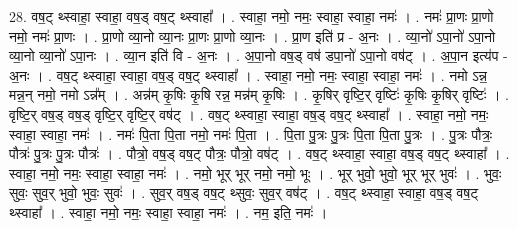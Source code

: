 \documentclass[17pt]{extarticle}
\begin{document}
28. वष॒ट् थ्स्वाहा॒ स्वाहा॒ वष॒ड् वष॒ट् थ्स्वाहा᳚ । . स्वाहा॒ नमो॒ नमः॒ स्वाहा॒ स्वाहा॒ नमः॑ । . नमः॑ प्रा॒णः प्रा॒णो नमो॒ नमः॑ प्रा॒णः । . प्रा॒णो व्या॒नो व्या॒नः प्रा॒णः प्रा॒णो व्या॒नः । . प्रा॒ण इति॑ प्र - अ॒नः । . व्या॒नो॑ ऽपा॒नो॑ ऽपा॒नो व्या॒नो व्या॒नो॑ ऽपा॒नः । . व्या॒न इति॑ वि - अ॒नः । . अ॒पा॒नो वष॒ड् वष॑ डपा॒नो॑ ऽपा॒नो वष॑ट् । . अ॒पा॒न इत्य॑प - अ॒नः । . वष॒ट् थ्स्वाहा॒ स्वाहा॒ वष॒ड् वष॒ट् थ्स्वाहा᳚ । . स्वाहा॒ नमो॒ नमः॒ स्वाहा॒ स्वाहा॒ नमः॑ । . नमो ऽन्न॒ मन्न॒न् नमो॒ नमो ऽन्न᳚म् । . अन्न॑म् कृ॒षिः कृ॒षि रन्न॒ मन्न॑म् कृ॒षिः । . कृ॒षिर् वृष्टि॒र् वृष्टिः॑ कृ॒षिः कृ॒षिर् वृष्टिः॑ । . वृष्टि॒र् वष॒ड् वष॒ड् वृष्टि॒र् वृष्टि॒र् वष॑ट् । . वष॒ट् थ्स्वाहा॒ स्वाहा॒ वष॒ड् वष॒ट् थ्स्वाहा᳚ । . स्वाहा॒ नमो॒ नमः॒ स्वाहा॒ स्वाहा॒ नमः॑ । . नमः॑ पि॒ता पि॒ता नमो॒ नमः॑ पि॒ता । . पि॒ता पु॒त्रः पु॒त्रः पि॒ता पि॒ता पु॒त्रः । . पु॒त्रः पौत्रः॒ पौत्रः॑ पु॒त्रः पु॒त्रः पौत्रः॑ । . पौत्रो॒ वष॒ड् वष॒ट् पौत्रः॒ पौत्रो॒ वष॑ट् । . वष॒ट् थ्स्वाहा॒ स्वाहा॒ वष॒ड् वष॒ट् थ्स्वाहा᳚ । . स्वाहा॒ नमो॒ नमः॒ स्वाहा॒ स्वाहा॒ नमः॑ । . नमो॒ भूर् भूर् नमो॒ नमो॒ भूः । . भूर् भुवो॒ भुवो॒ भूर् भूर् भुवः॑ । . भुवः॒ सुवः॒ सुव॒र् भुवो॒ भुवः॒ सुवः॑ । . सुव॒र् वष॒ड् वष॒ट् थ्सुवः॒ सुव॒र् वष॑ट् । . वष॒ट् थ्स्वाहा॒ स्वाहा॒ वष॒ड् वष॒ट् थ्स्वाहा᳚ । . स्वाहा॒ नमो॒ नमः॒ स्वाहा॒ स्वाहा॒ नमः॑ । . नम॒ इति॒ नमः॑ । \newline
\end{document}
